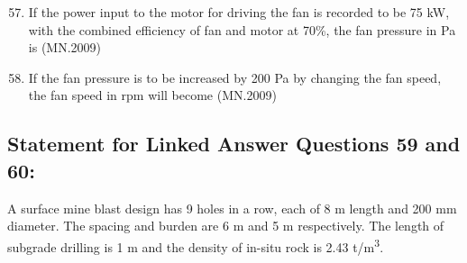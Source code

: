 \documentclass[journal]{IEEEtran}
\numberwithin{equation}{enumi}
\numberwithin{figure}{enumi}
\begin{document}
\begin{enumerate}[label=Q.\arabic*]
\setcounter{enumi}{56}

\item If the power input to the motor for driving the fan is recorded to be 75 kW, with the combined efficiency of fan and motor at 70\%, the fan pressure in Pa is
\hfill{(MN.2009)}
\begin{enumerate}[label=(\Alph*)]
\end{enumerate}

\item If the fan pressure is to be increased by 200 Pa by changing the fan speed, the fan speed in rpm will become
\hfill{(MN.2009)}
\begin{enumerate}[label=(\Alph*)]
\end{enumerate}

\end{enumerate}

\subsection*{Statement for Linked Answer Questions 59 and 60:}

A surface mine blast design has 9 holes in a row, each of 8 m length and 200 mm diameter. The spacing and burden are 6 m and 5 m respectively. The length of subgrade drilling is 1 m and the density of in-situ rock is 2.43 t/m\textsuperscript{3}.
\end{document}
